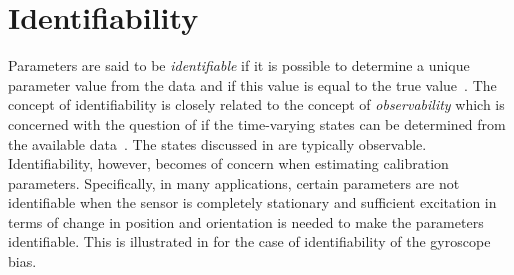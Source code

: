 \section{Identifiability}
\label{sec:calibration-identifiability}
Parameters are said to be \emph{identifiable} if it is possible to determine a unique parameter value from the data and if this value is equal to the true value~\citep{ljung:1999}. The concept of identifiability is closely related to the concept of \emph{observability} which is concerned with the question of if the time-varying states can be determined from the available data~\citep{kailath:1980}. The states discussed in  are typically observable. Identifiability, however, becomes of concern when estimating calibration parameters. Specifically, in many applications, certain parameters are not identifiable when the sensor is completely stationary and sufficient excitation in terms of change in position and orientation is needed to make the parameters identifiable. This is illustrated in  for the case of identifiability of the gyroscope bias.

